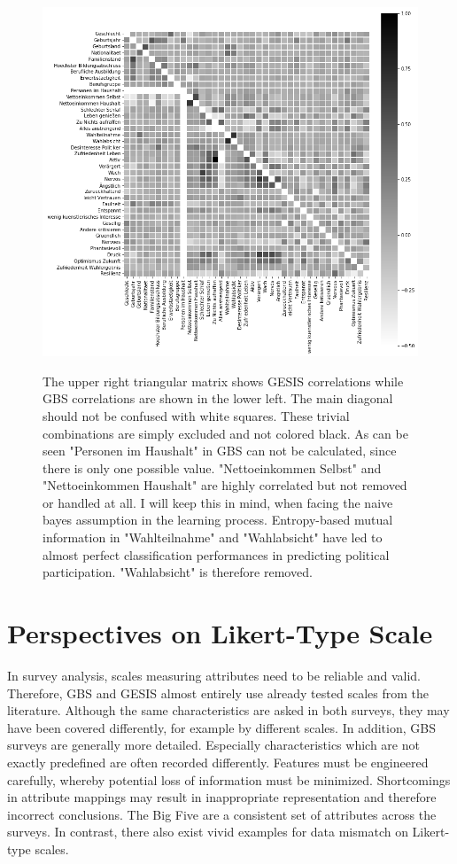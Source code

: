 \begin{figure}[ht]
	\begin{center}
		\includegraphics[scale=0.73,angle=0]{fig/correl}
		\label{corr}
		\caption{The upper right triangular matrix shows GESIS correlations while GBS correlations are shown in the lower left. The main diagonal should not be confused with white squares. These trivial combinations are simply excluded and not colored black. As can be seen "Personen im Haushalt" in GBS can not be calculated, since there is only one possible value. "Nettoeinkommen Selbst" and "Nettoeinkommen Haushalt" are highly correlated but not removed or handled at all. I will keep this in mind, when facing the naive bayes assumption in the learning process. Entropy-based mutual information in "Wahlteilnahme" and "Wahlabsicht" have led to almost perfect classification performances in predicting political participation. "Wahlabsicht" is therefore removed.}
	\end{center}
\end{figure}

\section{Perspectives on Likert-Type Scale}

In survey analysis, scales measuring attributes need to be reliable and valid. Therefore, GBS and GESIS almost entirely use already tested scales from the literature. Although the same characteristics are asked in both surveys, they may have been covered differently, for example by different scales. In addition, GBS surveys are generally more detailed. Especially characteristics which are not exactly predefined are often recorded differently. Features must be engineered carefully, whereby potential loss of information must be minimized. Shortcomings in attribute mappings may result in inappropriate representation and therefore incorrect conclusions. The Big Five are a consistent set of attributes across the surveys. In contrast, there also exist vivid examples for data mismatch on Likert-type scales.

